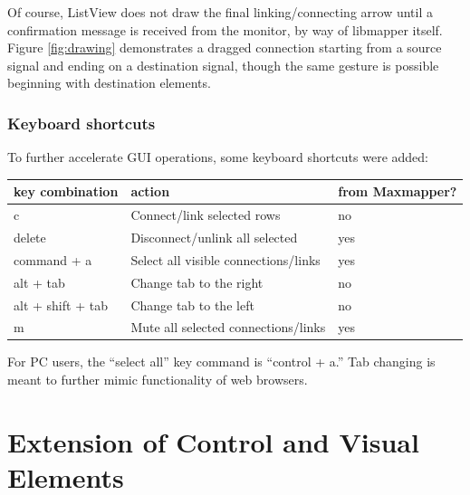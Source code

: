 Of course, ListView does not draw the final linking/connecting arrow until a confirmation message is received from the monitor, by way of libmapper itself. Figure \ref{fig:drawing} demonstrates a dragged connection starting from a source signal and ending on a destination signal, though the same gesture is possible beginning with destination elements.


		\subsubsection{Keyboard shortcuts}

To further accelerate GUI operations, some keyboard shortcuts were added:

\begin{table}[!h]
	\centering
	\label{tab:list_view_shortcut_keys}
		\begin{tabular}{l  l  l}
		\hline\hline
		key combination&action&from Maxmapper?\\
		\hline
		c 					& Connect/link selected rows & no\\
		delete 				& Disconnect/unlink all selected & yes\\
		command + a 		& Select all visible connections/links & yes\\
		alt + tab 			& Change tab to the right & no\\
		alt + shift + tab 	& Change tab to the left & no\\ 
		m 					& Mute all selected connections/links & yes\\
		\end{tabular}
\end{table}

For PC users, the ``select all'' key command is ``control + a.'' Tab changing is meant to further mimic functionality of web browsers. 



\section{Extension of Control and Visual Elements} %
\label{sec:extension_of_control_and_visual_elements}

